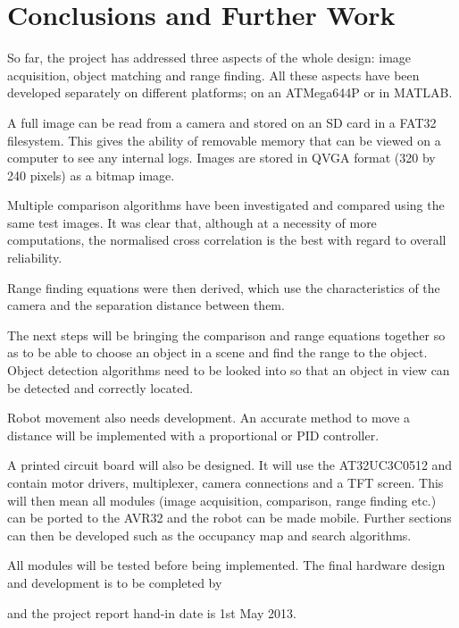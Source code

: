 \chapter{Conclusions and Further Work} \label{Chapter: Conclusions}

So far, the project has addressed three aspects of the whole design: image acquisition, object matching and range finding. All these aspects have been developed separately on different platforms; on an ATMega644P or in MATLAB. 

A full image can be read from a camera and stored on an SD card in a FAT32 filesystem. This gives the ability of removable memory that can be viewed on a computer to see any internal logs. Images are stored in QVGA format (320 by 240 pixels) as a bitmap image. 

Multiple comparison algorithms have been investigated and compared using the same test images. It was clear that, although at a necessity of more computations, the normalised cross correlation is the best with regard to overall reliability.

Range finding equations were then derived, which use the characteristics of the camera and the separation distance between them. 

The next steps will be bringing the comparison and range equations together so as to be able to choose an object in a scene and find the range to the object. Object detection algorithms need to be looked into so that an object in view can be detected and correctly located. 

Robot movement also needs development. An accurate method to move a distance will be implemented with a proportional or PID controller. 

A printed circuit board will also be designed. It will use the AT32UC3C0512 and contain motor drivers, \itc multiplexer, camera connections and a TFT screen. This will then mean all modules (image acquisition, comparison, range finding etc.) can be ported to the AVR32 and the robot can be made mobile. Further sections can then be developed such as the occupancy map and search algorithms. 

All modules will be tested before being implemented. The final hardware design and development is to be completed by \date{15th March 2013} and the project report hand-in date is 1st May 2013. 